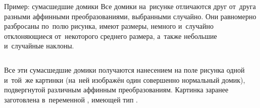 \begin{frame}{Пример: сумасшедшие домики}
Все домики на~рисунке отличаются друг от~друга разными аффинными
преобразованиями, выбранными случайно. Они равномерно разбросаны по~полю
рисунка, имеют размеры, немного и~случайно отклоняющиеся от~некоторого среднего
размера, а~также небольшие и~случайные наклоны.

\bigskip

\begin{columns}[onlytextwidth]
Все эти сумасшедшие домики получаются нанесением на поле рисунка одной и~той~же
картинки (на~ней изображён один совершенно нормальный домик), подвергнутой
различным аффинным преобразованиям. Картинка заранее заготовлена в~переменной
, имеющей тип .
\centerline{}
\end{columns}
\end{frame}

